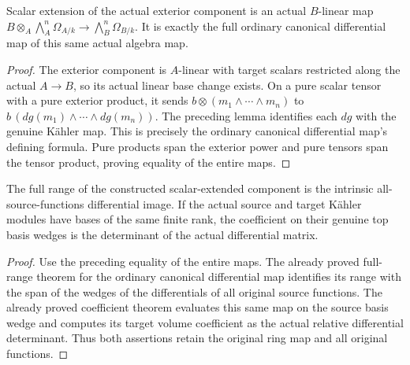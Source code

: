 \begin{definition}\label{sc0-canonical-morphism-sections:base-change}
\leanok
{}
Scalar extension of the actual exterior component is an actual $B$-linear map $B\otimes_A\bigwedge_A^n\Omega_{A/k}\to\bigwedge_B^n\Omega_{B/k}$. It is exactly the full ordinary canonical differential map of this same actual algebra map.
\end{definition}
\begin{proof}
The exterior component is $A$-linear with target scalars restricted along the actual $A\to B$, so its actual linear base change exists. On a pure scalar tensor with a pure exterior product, it sends $b\otimes(m_1\wedge\cdots\wedge m_n)$ to $b\,(dg(m_1)\wedge\cdots\wedge dg(m_n))$. The preceding lemma identifies each $dg$ with the genuine Kähler map. This is precisely the ordinary canonical differential map's defining formula. Pure products span the exterior power and pure tensors span the tensor product, proving equality of the entire maps.
\end{proof}

\begin{theorem}\label{sc0-canonical-morphism-sections:image}
\leanok
{}
The full range of the constructed scalar-extended component is the intrinsic all-source-functions differential image. If the actual source and target Kähler modules have bases of the same finite rank, the coefficient on their genuine top basis wedges is the determinant of the actual differential matrix.
\end{theorem}
\begin{proof}
Use the preceding equality of the entire maps. The already proved full-range theorem for the ordinary canonical differential map identifies its range with the span of the wedges of the differentials of all original source functions. The already proved coefficient theorem evaluates this same map on the source basis wedge and computes its target volume coefficient as the actual relative differential determinant. Thus both assertions retain the original ring map and all original functions.
\end{proof}
